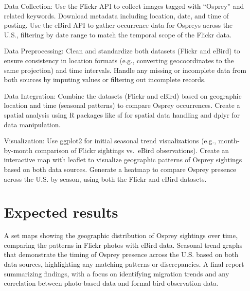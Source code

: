 \documentclass[
]{article}
\begin{document}
Data Collection: Use the Flickr API to collect images tagged with
``Osprey'' and related keywords. Download metadata including location,
date, and time of posting. Use the eBird API to gather occurrence data
for Ospreys across the U.S., filtering by date range to match the
temporal scope of the Flickr data.

Data Preprocessing: Clean and standardize both datasets (Flickr and
eBird) to ensure consistency in location formats (e.g., converting
geocoordinates to the same projection) and time intervals. Handle any
missing or incomplete data from both sources by imputing values or
filtering out incomplete records.

Data Integration: Combine the datasets (Flickr and eBird) based on
geographic location and time (seasonal patterns) to compare Osprey
occurrences. Create a spatial analysis using R packages like sf for
spatial data handling and dplyr for data manipulation.

Visualization: Use ggplot2 for initial seasonal trend visualizations
(e.g., month-by-month comparison of Flickr sightings vs.~eBird
observations). Create an interactive map with leaflet to visualize
geographic patterns of Osprey sightings based on both data sources.
Generate a heatmap to compare Osprey presence across the U.S. by season,
using both the Flickr and eBird datasets.

\section{Expected results}\label{expected-results}

A set maps showing the geographic distribution of Osprey sightings over
time, comparing the patterns in Flickr photos with eBird data. Seasonal
trend graphs that demonstrate the timing of Osprey presence across the
U.S. based on both data sources, highlighting any matching patterns or
discrepancies. A final report summarizing findings, with a focus on
identifying migration trends and any correlation between photo-based
data and formal bird observation data.
\end{document}
